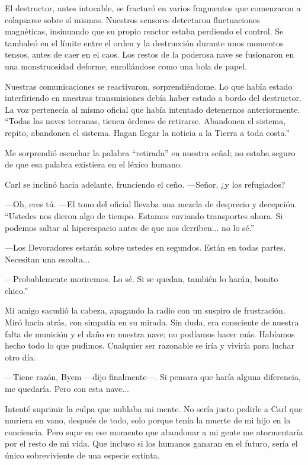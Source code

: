 \documentclass[spanish,12pt,a4paper,oneside,titlepage]{book}
\begin{document}
    El destructor, antes intocable, se fracturó en varios fragmentos que comenzaron a colapsarse sobre sí mismos. Nuestros sensores detectaron fluctuaciones magnéticas, insinuando que su propio reactor estaba perdiendo el control. Se tambaleó en el límite entre el orden y la destrucción durante unos momentos tensos, antes de caer en el caos. Los restos de la poderosa nave se fusionaron en una monstruosidad deforme, enrollándose como una bola de papel.

    Nuestras comunicaciones se reactivaron, sorprendiéndome. Lo que había estado interfiriendo en nuestras transmisiones debía haber estado a bordo del destructor. La voz pertenecía al mismo oficial que había intentado detenernos anteriormente. ``Todas las naves terranas, tienen órdenes de retirarse. Abandonen el sistema, repito, abandonen el sistema. Hagan llegar la noticia a la Tierra a toda costa.''

    Me sorprendió escuchar la palabra ``retirada'' en nuestra señal; no estaba seguro de que esa palabra existiera en el léxico humano.

    Carl se inclinó hacia adelante, frunciendo el ceño. —Señor, ¿y los refugiados?

    —Oh, eres tú. —El tono del oficial llevaba una mezcla de desprecio y decepción. ``Ustedes nos dieron algo de tiempo. Estamos enviando transportes ahora. Si podemos saltar al hiperespacio antes de que nos derriben... no lo sé.''

    —Los Devoradores estarán sobre ustedes en segundos. Están en todas partes. Necesitan una escolta...

    —Probablemente moriremos. Lo sé. Si se quedan, también lo harán, bonito chico.''

    Mi amigo sacudió la cabeza, apagando la radio con un suspiro de frustración. Miró hacia atrás, con simpatía en su mirada. Sin duda, era consciente de nuestra falta de munición y el daño en nuestra nave; no podíamos hacer más. Habíamos hecho todo lo que pudimos. Cualquier ser razonable se iría y viviría para luchar otro día.

    —Tiene razón, Byem —dijo finalmente—. Si pensara que haría alguna diferencia, me quedaría. Pero con esta nave...

    Intenté suprimir la culpa que nublaba mi mente. No sería justo pedirle a Carl que muriera en vano, después de todo, solo porque tenía la muerte de mi hijo en la conciencia. Pero supe en ese momento que abandonar a mi gente me atormentaría por el resto de mi vida. Que incluso si los humanos ganaran en el futuro, sería el único sobreviviente de una especie extinta.
\end{document}
